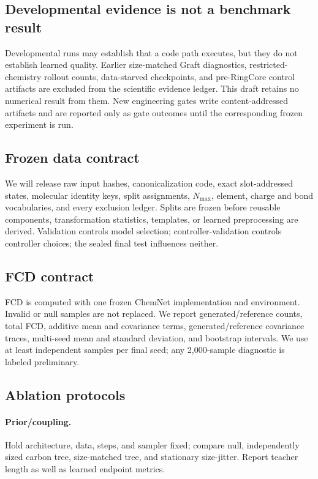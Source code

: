 \documentclass{article}
\theoremstyle{definition}
\theoremstyle{remark}
\begin{document}
\subsection{Developmental evidence is not a benchmark result}\label{app:dev}

Developmental runs may establish that a code path executes, but they do not establish learned quality. Earlier size-matched Graft diagnostics, restricted-chemistry rollout counts, data-starved checkpoints, and pre-RingCore control artifacts are excluded from the scientific evidence ledger. This draft retains no numerical result from them. New engineering gates write content-addressed artifacts and are reported only as gate outcomes until the corresponding frozen experiment is run.


\subsection{Frozen data contract}

We will release raw input hashes, canonicalization code, exact slot-addressed states, molecular identity keys, split assignments, $N_{\max}$, element, charge and bond vocabularies, and every exclusion ledger. Splits are frozen before reusable components, transformation statistics, templates, or learned preprocessing are derived. Validation controls model selection; controller-validation controls controller choices; the sealed final test influences neither.

\subsection{FCD contract}

FCD is computed with one frozen ChemNet implementation and environment. Invalid or null samples are not replaced. We report generated/reference counts, total FCD, additive mean and covariance terms, generated/reference covariance traces, multi-seed mean and standard deviation, and bootstrap intervals. We use at least \XXX independent samples per final seed; any 2,000-sample diagnostic is labeled preliminary.

\subsection{Ablation protocols}

\paragraph{Prior/coupling.}
Hold architecture, data, steps, and sampler fixed; compare null, independently sized carbon tree, size-matched tree, and stationary size-jitter. Report teacher length as well as learned endpoint metrics.
\end{document}

